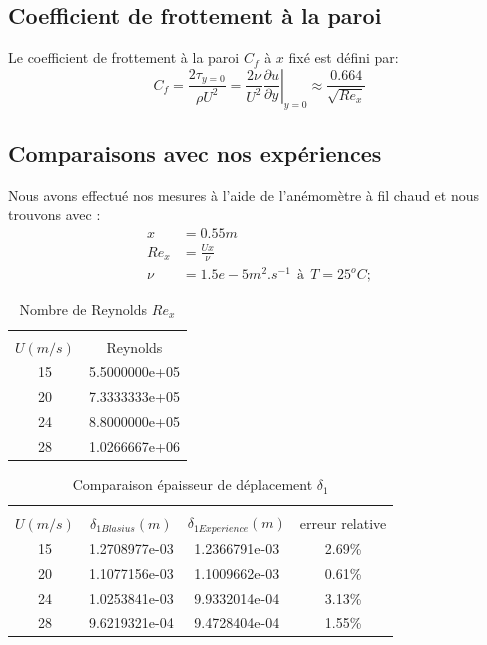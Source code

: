\subsection{Coefficient de frottement à la paroi}
Le coefficient de frottement à la paroi $C_{f}$ à $x$ fixé est défini par:
\begin{equation}
	C_{f} =
	\frac{2\tau_{y=0}}{\rho U^{2}} =
	\frac{2\nu}{U^{2}}
	\left.
	\frac{\partial u}{\partial y}
	\right|_{y = 0} \approx \frac{0.664}{\sqrt{Re_{x}}}
\end{equation}
\subsection{Comparaisons avec nos expériences}
Nous avons effectué nos mesures à l'aide de l'anémomètre à fil chaud et nous trouvons avec :
\begin{align*}
	x &= 0.55m\\
	Re_{x} &= \frac{Ux}{\nu}\\
	\nu &= 1.5e-5 m^{2}.s^{-1}~~\text{à}~~T = 25^{o}C; 
\end{align*}
\begin{table}[ht]
	\centering
	\begin{tabular}{cc}
		\hline\\
		$U(m/s)$ & Reynolds\\
		\hline
   15 & 5.5000000e+05\\
   20 & 7.3333333e+05\\
   24 & 8.8000000e+05\\
   28 & 1.0266667e+06
	\end{tabular}
	\caption{Nombre de Reynolds $Re_{x}$}
\end{table}
\begin{table}[ht]
	\centering
	\begin{tabular}{cccc}
		\hline\\
		$U(m/s)$ & $\delta_{1Blasius}(m)$ &
		$ \delta_{1Experience}(m)$ & 
		 erreur relative\\
		\hline
		15   & 1.2708977e-03   & 1.2366791e-03   & 2.69\%\\
		20   & 1.1077156e-03   & 1.1009662e-03   & 0.61\%\\
		24   & 1.0253841e-03   & 9.9332014e-04   & 3.13\%\\
		28   & 9.6219321e-04   & 9.4728404e-04   & 1.55\%
	\end{tabular}
	\caption{Comparaison épaisseur de déplacement $\delta_{1}$}
\end{table}
